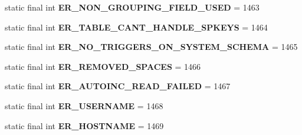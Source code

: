 \begin{DoxyCompactItemize}
\item 
\mbox{\label{classcom_1_1mysql_1_1cj_1_1exceptions_1_1_mysql_error_numbers_ada599ad4d7c8f968977b244ad25bf471}} 
static final int {\bfseries E\+R\+\_\+\+N\+O\+N\+\_\+\+G\+R\+O\+U\+P\+I\+N\+G\+\_\+\+F\+I\+E\+L\+D\+\_\+\+U\+S\+ED} = 1463
\item 
\mbox{\label{classcom_1_1mysql_1_1cj_1_1exceptions_1_1_mysql_error_numbers_a36995cf3bcc791192ee2304f042677ce}} 
static final int {\bfseries E\+R\+\_\+\+T\+A\+B\+L\+E\+\_\+\+C\+A\+N\+T\+\_\+\+H\+A\+N\+D\+L\+E\+\_\+\+S\+P\+K\+E\+YS} = 1464
\item 
\mbox{\label{classcom_1_1mysql_1_1cj_1_1exceptions_1_1_mysql_error_numbers_a125138c66cd9a280a3508d3f3bb83943}} 
static final int {\bfseries E\+R\+\_\+\+N\+O\+\_\+\+T\+R\+I\+G\+G\+E\+R\+S\+\_\+\+O\+N\+\_\+\+S\+Y\+S\+T\+E\+M\+\_\+\+S\+C\+H\+E\+MA} = 1465
\item 
\mbox{\label{classcom_1_1mysql_1_1cj_1_1exceptions_1_1_mysql_error_numbers_ad91e30e199f736fd6b608fff43fb6c48}} 
static final int {\bfseries E\+R\+\_\+\+R\+E\+M\+O\+V\+E\+D\+\_\+\+S\+P\+A\+C\+ES} = 1466
\item 
\mbox{\label{classcom_1_1mysql_1_1cj_1_1exceptions_1_1_mysql_error_numbers_a253c909d4200cccb8f8d34798efe2d1c}} 
static final int {\bfseries E\+R\+\_\+\+A\+U\+T\+O\+I\+N\+C\+\_\+\+R\+E\+A\+D\+\_\+\+F\+A\+I\+L\+ED} = 1467
\item 
\mbox{\label{classcom_1_1mysql_1_1cj_1_1exceptions_1_1_mysql_error_numbers_a983051bfcc5055e652b0c2d420765b15}} 
static final int {\bfseries E\+R\+\_\+\+U\+S\+E\+R\+N\+A\+ME} = 1468
\item 
\mbox{\label{classcom_1_1mysql_1_1cj_1_1exceptions_1_1_mysql_error_numbers_a6c9114e2ade04c42b1a61f7d7170f318}} 
static final int {\bfseries E\+R\+\_\+\+H\+O\+S\+T\+N\+A\+ME} = 1469

\end{DoxyCompactItemize}
